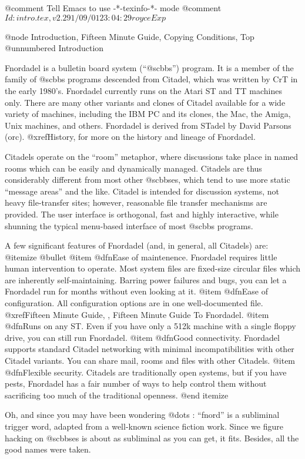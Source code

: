 @comment Tell Emacs to use -*-texinfo-*- mode
@comment $Id: intro.tex,v 2.2 91/09/01 23:04:29 royce Exp $

@node Introduction, Fifteen Minute Guide, Copying Conditions, Top
@unnumbered Introduction

Fnordadel is a bulletin board system (``@sc{bbs}'') program.  It is a member of
the family of @sc{bbs} programs descended from Citadel, which was written by CrT
in the early 1980's.  Fnordadel currently runs on the Atari ST and TT
machines only.  There are many other variants and clones of Citadel available
for a wide variety of machines, including the IBM PC and its clones, the Mac,
the Amiga, Unix machines, and others.  Fnordadel is derived from
STadel by David Parsons (orc).  @xref{History}, for more on the
history and lineage of Fnordadel.

Citadels operate on the ``room'' metaphor, where discussions take place in
named rooms which can be easily and dynamically managed.  Citadels are thus
considerably different from most other @sc{bbs}es, which tend to use more static
``message areas'' and the like.  Citadel is intended for discussion systems,
not heavy file-transfer sites; however, reasonable file transfer mechanisms are
provided.  The user interface is orthogonal, fast and highly interactive, while
shunning the typical menu-based interface of most @sc{bbs} programs.

A few significant features of Fnordadel (and, in general, all Citadels) are:
@itemize @bullet
@item
@dfn{Ease of maintenence}. Fnordadel requires little human intervention to
operate.  Most system files are fixed-size circular files which are inherently
self-maintaining.  Barring power failures and bugs, you can let a
Fnordadel run for months without even looking at it.
@item
@dfn{Ease of configuration}.  All configuration options are in one
well-documented file.  @xref{Fifteen Minute Guide, , Fifteen Minute Guide
To Fnordadel}. 
@item
@dfn{Runs on any ST}.  Even if you have only a 512k machine with a single
floppy drive, you can still run Fnordadel.
@item
@dfn{Good connectivity}.  Fnordadel supports standard Citadel networking
with minimal incompatibilities with other Citadel variants.  You can share
mail, rooms and files with other Citadels.
@item
@dfn{Flexible security}.  Citadels are traditionally open systems, but if you
have pests, Fnordadel has a fair number of ways to help control them without
sacrificing too much of the traditional openness.
@end itemize

Oh, and since you may have been wondering @dots{} : ``fnord'' is a subliminal
trigger word, adapted from a well-known science fiction work.  Since we figure
hacking on @sc{bbs}es is about as subliminal as you can get, it fits.  Besides, 
all the good names were taken.

